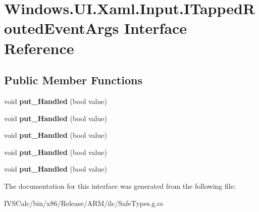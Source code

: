 \hypertarget{interface_windows_1_1_u_i_1_1_xaml_1_1_input_1_1_i_tapped_routed_event_args}{}\section{Windows.\+U\+I.\+Xaml.\+Input.\+I\+Tapped\+Routed\+Event\+Args Interface Reference}
\label{interface_windows_1_1_u_i_1_1_xaml_1_1_input_1_1_i_tapped_routed_event_args}
\subsection*{Public Member Functions}
\begin{DoxyCompactItemize}
\item 
\mbox{\label{interface_windows_1_1_u_i_1_1_xaml_1_1_input_1_1_i_tapped_routed_event_args_a0f55c779cac873a459d1e2c518a79c58}} 
void {\bfseries put\+\_\+\+Handled} (bool value)
\item 
\mbox{\label{interface_windows_1_1_u_i_1_1_xaml_1_1_input_1_1_i_tapped_routed_event_args_a0f55c779cac873a459d1e2c518a79c58}} 
void {\bfseries put\+\_\+\+Handled} (bool value)
\item 
\mbox{\label{interface_windows_1_1_u_i_1_1_xaml_1_1_input_1_1_i_tapped_routed_event_args_a0f55c779cac873a459d1e2c518a79c58}} 
void {\bfseries put\+\_\+\+Handled} (bool value)
\item 
\mbox{\label{interface_windows_1_1_u_i_1_1_xaml_1_1_input_1_1_i_tapped_routed_event_args_a0f55c779cac873a459d1e2c518a79c58}} 
void {\bfseries put\+\_\+\+Handled} (bool value)
\item 
\mbox{\label{interface_windows_1_1_u_i_1_1_xaml_1_1_input_1_1_i_tapped_routed_event_args_a0f55c779cac873a459d1e2c518a79c58}} 
void {\bfseries put\+\_\+\+Handled} (bool value)
\end{DoxyCompactItemize}


The documentation for this interface was generated from the following file\+:\begin{DoxyCompactItemize}
\item 
I\+V\+S\+Calc/bin/x86/\+Release/\+A\+R\+M/ilc/Safe\+Types.\+g.\+cs\end{DoxyCompactItemize}
